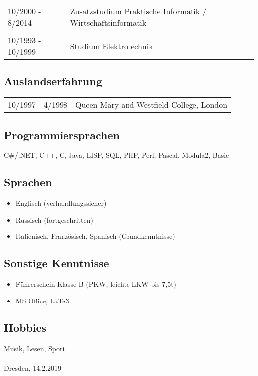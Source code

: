 \documentclass{article}
\begin{document}
\begin{tabular}{lp{15cm}}
10/2000 - 8/2014	& Zusatzstudium Praktische Informatik / Wirtschaftsinformatik\\
\\
10/1993 - 10/1999	& Studium Elektrotechnik\\
\end{tabular}


\subsection*{Auslandserfahrung}
  \begin{tabular}{lp{15cm}}
    10/1997 - 4/1998	& Queen Mary and Westfield College, London
  \end{tabular}
	
\subsection*{Programmiersprachen}
  C\#/.NET, C++, C, Java, LISP, SQL, PHP, Perl, Pascal, Modula2, Basic
		
\subsection*{Sprachen}
  \begin{itemize}
    \item{Englisch (verhandlungssicher)}
    \item{Russisch (fortgeschritten)}
    \item{Italienisch, Französisch, Spanisch (Grundkenntnisse)}
  \end{itemize}

\subsection*{Sonstige Kenntnisse}
  \begin{itemize}
    \item{F\"uhrerschein Klasse B (PKW, leichte LKW bis 7,5t)}
    \item{MS Office, \LaTeX{}}
  \end{itemize}

\subsection*{Hobbies}
Musik, Lesen, Sport\\
\\
Dresden, 14.2.2019
\end{document}
